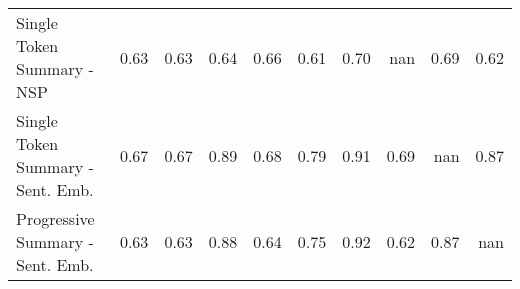 \begin{tabular}{lrrrrrrrrr}
Single Token Summary - NSP & \cellcolor[RGB]{76,102,214}0.63 & \cellcolor[RGB]{75,100,212}0.63 & \cellcolor[RGB]{86,115,224}0.64 & \cellcolor[RGB]{100,133,235}0.66 & \cellcolor[RGB]{58,76,192}0.61 & \cellcolor[RGB]{138,173,253}0.70 & \cellcolor[RGB]{0,0,0}nan & \cellcolor[RGB]{128,164,250}0.69 & \cellcolor[RGB]{65,86,201}0.62 \\
Single Token Summary - Sent. Emb. & \cellcolor[RGB]{109,144,241}0.67 & \cellcolor[RGB]{107,141,240}0.67 & \cellcolor[RGB]{245,161,130}0.89 & \cellcolor[RGB]{120,155,247}0.68 & \cellcolor[RGB]{209,218,232}0.79 & \cellcolor[RGB]{242,145,115}0.91 & \cellcolor[RGB]{128,164,250}0.69 & \cellcolor[RGB]{0,0,0}nan & \cellcolor[RGB]{247,181,152}0.87 \\
Progressive Summary - Sent. Emb. & \cellcolor[RGB]{75,100,212}0.63 & \cellcolor[RGB]{71,95,208}0.63 & \cellcolor[RGB]{247,177,148}0.88 & \cellcolor[RGB]{86,115,224}0.64 & \cellcolor[RGB]{178,203,251}0.75 & \cellcolor[RGB]{236,128,100}0.92 & \cellcolor[RGB]{65,86,201}0.62 & \cellcolor[RGB]{247,181,152}0.87 & \cellcolor[RGB]{0,0,0}nan \\
\bottomrule
\end{tabular}